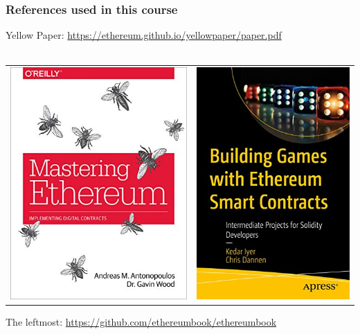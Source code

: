 \documentclass[11pt]{beamer}  %
\begin{document}
\begin{frame}\frametitle{References used in this course}

  \begin{center}
    Yellow Paper: \url{https://ethereum.github.io/yellowpaper/paper.pdf}\\
    \mbox{}\\
    \begin{tabular}{c@{\hskip 1.5cm}c}
      \includegraphics[scale=.3,clip=false]{pictures/mastering-ethereum.jpg} &
      \includegraphics[scale=.3,clip=false]{pictures/building-games.jpg}
    \end{tabular}
  \end{center}

  The leftmost: \url{https://github.com/ethereumbook/ethereumbook}

\end{frame}
\end{document}
